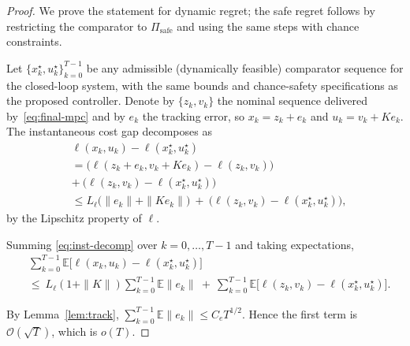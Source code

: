 \documentclass[journal]{IEEEtran}
\theoremstyle{definition}
\begin{document}
\begin{proof}
We prove the statement for dynamic regret; the safe regret follows by restricting the comparator to $\Pi_{\mathrm{safe}}$ and using the same steps with chance constraints.

 
Let $\{x_k^\star,u_k^\star\}_{k=0}^{T-1}$ be any admissible (dynamically feasible) comparator sequence for the closed-loop system, with the same bounds and chance-safety specifications as the proposed controller. Denote by $\{z_k,v_k\}$ the nominal sequence delivered by~\eqref{eq:final-mpc} and by $e_k$ the tracking error, so $x_k=z_k+e_k$ and $u_k=v_k+Ke_k$. The instantaneous cost gap decomposes as
\begin{align}
&\ell(x_k,u_k)-\ell(x_k^\star,u_k^\star)\\
&=\big(\ell(z_k+e_k,v_k+Ke_k)-\ell(z_k,v_k)\big)\ \\
&+\ \big(\ell(z_k,v_k)-\ell(x_k^\star,u_k^\star)\big) \nonumber\\
&\le L_\ell\big(\|e_k\|+\|Ke_k\|\big)\ +\ \big(\ell(z_k,v_k)-\ell(x_k^\star,u_k^\star)\big),
\label{eq:inst-decomp}
\end{align}
by the Lipschitz property of $\ell$.

 
Summing \eqref{eq:inst-decomp} over $k=0,\dots,T-1$ and taking expectations,
\begin{align}
&\sum_{k=0}^{T-1}\mathbb{E}\big[\ell(x_k,u_k)-\ell(x_k^\star,u_k^\star)\big]\\
& \le\ L_\ell(1+\|K\|)\sum_{k=0}^{T-1}\mathbb{E}\|e_k\|
\ +\ \sum_{k=0}^{T-1}\mathbb{E}\big[\ell(z_k,v_k)-\ell(x_k^\star,u_k^\star)\big].
\end{align}

By Lemma~\ref{lem:track}, $\sum_{k=0}^{T-1}\mathbb{E}\|e_k\| \le C_e T^{1/2}$. Hence the first term is $\mathcal{O}(\sqrt{T})$, which is $o(T)$.


\end{proof}
\end{document}
